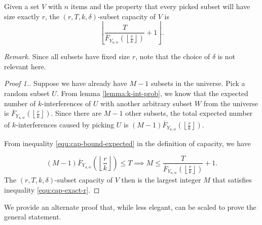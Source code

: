     \begin{theorem}
        \label{thm:exact-r}
        Given a set $V$ with $n$ items and the property that every picked subset will have size exactly $r$, the $(r,T,k,\delta)$-subset capacity of $V$ is 
        \begin{equation*}
            \left\lfloor \frac{T}{\bar{F}_{Y_{u,w}}\left(\left\lfloor \frac{r}{k} \right\rfloor\right)} + 1 \right\rfloor.
        \end{equation*}
    \end{theorem}

    \textit{Remark.} Since all subsets have fixed size $r$, note that the choice of $\delta$ is not relevant here.

    \begin{proof}[Proof 1.]
         Suppose we have already have $M-1$ subsets in the universe. Pick a random subset $U$. From lemma \ref{lemma:k-int-prob}, we know that the expected number of $k$-interferences of $U$  with another arbitrary subset $W$ from the universe is $\bar{F}_{Y_{u,w}}\left(\left\lfloor \frac{r}{k} \right\rfloor\right)$. Since there are $M-1$ other subsets, the total expected number of $k$-interferences caused by picking $U$ is $(M-1) \bar{F}_{Y_{u,w}}\left(\left\lfloor \frac{r}{k} \right\rfloor\right)$.

        From inequality \ref{equ:cap-bound-expected} in the definition of capacity, we have 
        
            \begin{equation}
            \label{equ:cap-exact-r}
                (M-1) \bar{F}_{Y_{u,w}}\left(\left\lfloor \frac{r}{k} \right\rfloor\right) \le T \implies M \le \frac{T}{\bar{F}_{Y_{u,w}}\left(\left\lfloor \frac{r}{k} \right\rfloor\right)} + 1.
            \end{equation}
            The $(r,T,k,\delta)$-subset capacity of $V$ then is the largest integer $M$ that satisfies inequality \ref{equ:cap-exact-r}.
    \end{proof}

    We provide an alternate proof that, while less elegant, can be scaled to prove the general statement. 

